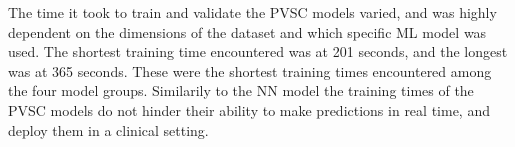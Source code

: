 The time it took to train and validate the PVSC models varied, and was highly dependent on the dimensions of the dataset and which specific ML model was used. The shortest training time encountered was at 201 seconds, and the longest was at 365 seconds. These were the shortest training times encountered among the four model groups. Similarily to the NN model the training times of the PVSC models do not hinder their ability to make predictions in real time, and deploy them in a clinical setting.

